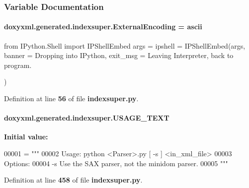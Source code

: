 \subsubsection{Variable Documentation}
\paragraph[{External\+Encoding}]{ doxyxml.\+generated.\+indexsuper.\+External\+Encoding = \textquotesingle{}ascii\textquotesingle{}}\label{namespacedoxyxml_1_1generated_1_1indexsuper_a9e6bd1ec13af07de0feb3e90600bd7ed}


from I\+Python.\+Shell import I\+P\+Shell\+Embed args = \textquotesingle{}\textquotesingle{} ipshell = I\+P\+Shell\+Embed(args, banner = \textquotesingle{}Dropping into I\+Python\textquotesingle{}, exit\+\_\+msg = \textquotesingle{}Leaving Interpreter, back to program. 

\textquotesingle{}) 

Definition at line {\bf 56} of file {\bf indexsuper.\+py}.

\paragraph[{U\+S\+A\+G\+E\+\_\+\+T\+E\+XT}]{ doxyxml.\+generated.\+indexsuper.\+U\+S\+A\+G\+E\+\_\+\+T\+E\+XT}\label{namespacedoxyxml_1_1generated_1_1indexsuper_a327f7705af1bbdb005b3c199c95c01cb}
{\bfseries Initial value\+:}
\begin{DoxyCode}
00001 = \textcolor{stringliteral}{"""}
00002 \textcolor{stringliteral}{Usage: python <Parser>.py [ -s ] <in\_xml\_file>}
00003 \textcolor{stringliteral}{Options:}
00004 \textcolor{stringliteral}{    -s        Use the SAX parser, not the minidom parser.}
00005 \textcolor{stringliteral}{"""}
\end{DoxyCode}


Definition at line {\bf 458} of file {\bf indexsuper.\+py}.

